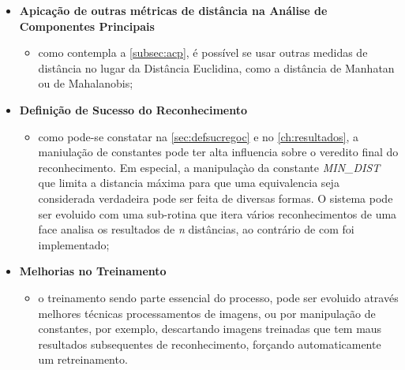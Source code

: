 \begin{itemize}	
	\item \textbf{Apicação de outras métricas de distância na Análise de Componentes Principais}
	\begin{itemize}	
		\item como contempla a \autoref{subsec:acp}, é possível se usar outras medidas de distância no lugar da Distância Euclidina, como a distância de Manhatan ou de Mahalanobis;
	\end{itemize}
	
	\item \textbf{Definição de Sucesso do Reconhecimento}
	\begin{itemize}	
		\item como pode-se constatar na \autoref{sec:defsucregoc} e no \autoref{ch:resultados}, a maniulação de constantes pode ter alta influencia sobre o veredito final do reconhecimento. Em especial, a manipulaçào da constante \textit{MIN\_DIST} que limita a distancia máxima para que uma equivalencia seja considerada verdadeira pode ser feita de diversas formas. O sistema pode ser evoluido com uma sub-rotina que itera vários reconhecimentos de uma face analisa os resultados de \textit{n} distâncias, ao contrário de com foi implementado;
	\end{itemize}
	
	\item \textbf{Melhorias no Treinamento}
	\begin{itemize}	
		\item o treinamento sendo parte essencial do processo, pode ser evoluido através melhores técnicas processamentos de imagens, ou por manipulação de constantes, por exemplo, descartando imagens treinadas que tem maus resultados subsequentes de reconhecimento, forçando automaticamente um retreinamento.
	\end{itemize}
\end{itemize}